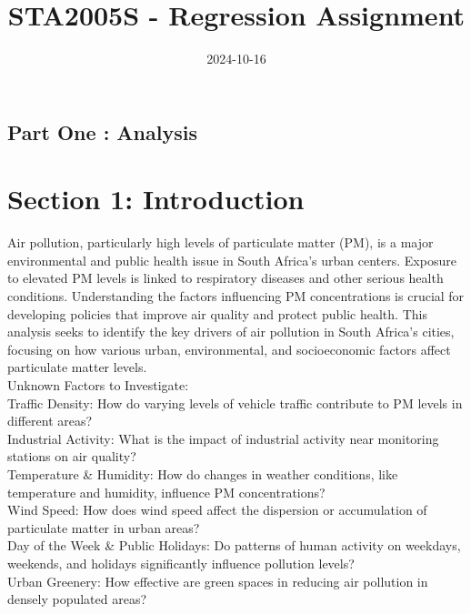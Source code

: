 \documentclass[12pt,halfline,a4paper,]{ouparticle}
\begin{document}
\title{STA2005S - Regression Assignment}

\author{%
%
%
%
%
%
%
%
%
%
\and
{}
%
%
%
%
%
%
}

\abstract{}

\date{2024-10-16}

\keywords{}

\maketitle



\newpage

\hypertarget{part-one-analysis}{%
\subsection{Part One : Analysis}\label{part-one-analysis}}

\hypertarget{section-1-introduction}{%
\section{Section 1: Introduction}\label{section-1-introduction}}

Air pollution, particularly high levels of particulate matter (PM), is a
major environmental and public health issue in South Africa's urban
centers. Exposure to elevated PM levels is linked to respiratory
diseases and other serious health conditions. Understanding the factors
influencing PM concentrations is crucial for developing policies that
improve air quality and protect public health. This analysis seeks to
identify the key drivers of air pollution in South Africa's cities,
focusing on how various urban, environmental, and socioeconomic factors
affect particulate matter levels.\\
Unknown Factors to Investigate:\\
Traffic Density: How do varying levels of vehicle traffic contribute to
PM levels in different areas?\\
Industrial Activity: What is the impact of industrial activity near
monitoring stations on air quality?\\
Temperature \& Humidity: How do changes in weather conditions, like
temperature and humidity, influence PM concentrations?\\
Wind Speed: How does wind speed affect the dispersion or accumulation of
particulate matter in urban areas?\\
Day of the Week \& Public Holidays: Do patterns of human activity on
weekdays, weekends, and holidays significantly influence pollution
levels?\\
Urban Greenery: How effective are green spaces in reducing air pollution
in densely populated areas?
\end{document}
